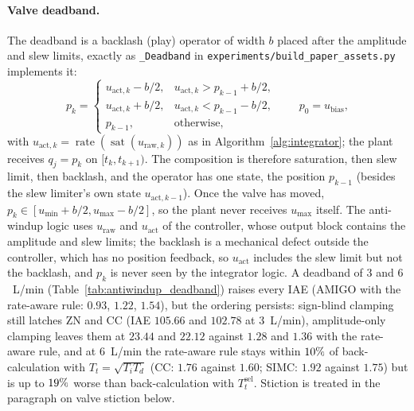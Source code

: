 \documentclass[11pt]{article}
\begin{document}
\paragraph{Valve deadband.} The deadband is a backlash (play) operator of width $b$ placed after the amplitude and slew limits, exactly as \texttt{\_Deadband} in \texttt{experiments/build\_paper\_assets.py} implements it:
\begin{equation}
    p_k = \begin{cases}
        u_{\text{act},k} - b/2, & u_{\text{act},k} > p_{k-1} + b/2, \\
        u_{\text{act},k} + b/2, & u_{\text{act},k} < p_{k-1} - b/2, \\
        p_{k-1}, & \text{otherwise},
    \end{cases}
    \qquad p_0 = u_{\text{bias}},
    \label{eq:backlash}
\end{equation}
with $u_{\text{act},k} = \operatorname{rate}(\operatorname{sat}(u_{\text{raw},k}))$ as in Algorithm~\ref{alg:integrator}; the plant receives $q_j = p_k$ on $[t_k, t_{k+1})$. The composition is therefore saturation, then slew limit, then backlash, and the operator has one state, the position $p_{k-1}$ (besides the slew limiter's own state $u_{\text{act},k-1}$). Once the valve has moved, $p_k \in [u_{\min} + b/2, u_{\max} - b/2]$, so the plant never receives $u_{\max}$ itself. The anti-windup logic uses $u_{\text{raw}}$ and $u_{\text{act}}$ of the controller, whose output block contains the amplitude and slew limits; the backlash is a mechanical defect outside the controller, which has no position feedback, so $u_{\text{act}}$ includes the slew limit but not the backlash, and $p_k$ is never seen by the integrator logic. A deadband of $3$ and $6$~L/min (Table~\ref{tab:antiwindup_deadband}) raises every IAE (AMIGO with the rate-aware rule: $0.93$, $1.22$, $1.54$), but the ordering persists: sign-blind clamping still latches ZN and CC (IAE $105.66$ and $102.78$ at $3$~L/min), amplitude-only clamping leaves them at $23.44$ and $22.12$ against $1.28$ and $1.36$ with the rate-aware rule, and at $6$~L/min the rate-aware rule stays within $10\%$ of back-calculation with $T_t = \sqrt{T_iT_d}$ (CC: $1.76$ against $1.60$; SIMC: $1.92$ against $1.75$) but is up to $19\%$ worse than back-calculation with $T_t^{\mathrm{sel}}$. Stiction is treated in the paragraph on valve stiction below.


\end{document}
